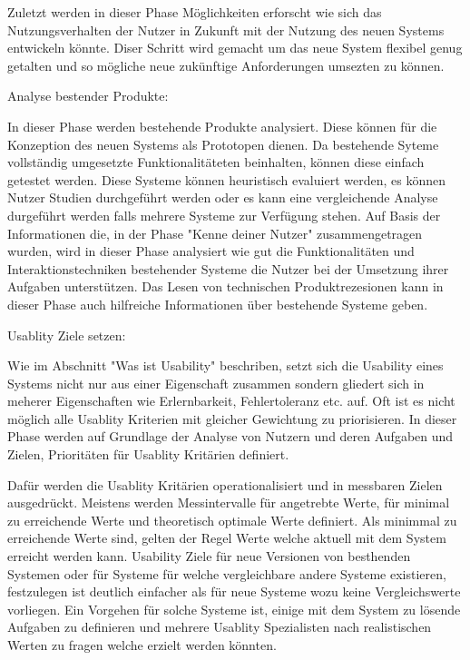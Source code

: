 Zuletzt werden in dieser Phase Möglichkeiten erforscht wie sich das Nutzungsverhalten der Nutzer in Zukunft mit der Nutzung des neuen Systems entwickeln könnte. Diser Schritt wird  
gemacht um das neue System flexibel genug getalten und so mögliche neue zukünftige Anforderungen umsezten zu können.

Analyse bestender Produkte: 

In dieser Phase werden bestehende Produkte analysiert. Diese können für die Konzeption des neuen Systems als Prototopen dienen. Da bestehende Syteme vollständig 
umgesetzte Funktionalitäteten beinhalten, können diese einfach getestet werden.    
Diese Systeme können heuristisch evaluiert werden, es können Nutzer Studien durchgeführt werden oder es kann eine vergleichende Analyse durgeführt werden falls mehrere Systeme zur 
Verfügung stehen. Auf Basis der Informationen die, in der Phase "Kenne deiner Nutzer" zusammengetragen wurden, wird in dieser Phase analysiert wie gut die  Funktionalitäten und Interaktionstechniken 
bestehender Systeme die Nutzer bei der Umsetzung ihrer Aufgaben unterstützen. Das Lesen von technischen Produktrezesionen kann in dieser Phase auch hilfreiche Informationen über bestehende Systeme geben. 

Usablity Ziele setzen: 

Wie im Abschnitt "Was ist Usability" beschriben, setzt sich die Usability eines Systems nicht nur aus einer Eigenschaft zusammen sondern gliedert sich in meherer Eigenschaften wie Erlernbarkeit, Fehlertoleranz etc. auf. 
Oft ist es nicht möglich alle Usablity Kriterien mit gleicher Gewichtung zu priorisieren. In dieser Phase werden auf Grundlage der Analyse von Nutzern und deren Aufgaben und Zielen,  Prioritäten für Usablity Kritärien definiert. 

Dafür werden die Usablity Kritärien operationalisiert und in messbaren Zielen ausgedrückt. Meistens werden Messintervalle für angetrebte Werte, für minimal zu erreichende Werte 
und theoretisch optimale Werte definiert. Als minimmal zu erreichende Werte sind, gelten der Regel Werte welche aktuell mit dem System erreicht werden kann. Usability Ziele für neue Versionen von besthenden Systemen 
oder für Systeme für welche vergleichbare andere Systeme existieren, festzulegen ist deutlich einfacher als für neue Systeme wozu keine Vergleichswerte vorliegen. Ein Vorgehen für solche Systeme ist, einige mit dem 
System zu lösende Aufgaben zu definieren und mehrere Usablity Spezialisten nach realistischen Werten zu fragen welche erzielt werden könnten.

